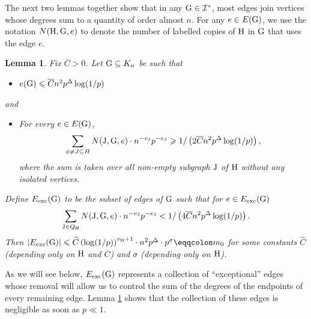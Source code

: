 \documentclass[a4paper,11pt,english,reqno]{amsart}
\numberwithin{equation}{section}
\renewcommand{\leq}{\leqslant}
\renewcommand{\geq}{\geqslant}
\newcommand{\cbar}{\overline{C}}
\newcommand{\I}{\mathcal{I}}
\newcommand{\uH}{\textup{H}}
\newcommand{\tu}[1]{\textup{#1}}
\newtheorem{lemma}[theorem]{Lemma}
\begin{document}
%	
%		
		The next two lemmas together show that in any $\tu{G}\in \I^{*}$, most edges join vertices whose degrees sum to a quantity of order almost $n$. For any $e\in E(\tu{G})$, we use the notation $N(\uH, \tu{G},e)$ to denote the number of labelled copies of $\uH$ in $\tu{G}$ that uses the edge $e$. 
		\begin{lemma}
			\label{s1:excluding edges}
			Fix $\cbar>0$. %
			Let $\tu{G}\subseteq K_{n}$ be such that 
			\begin{itemize}
				\item[(i).] $e(\tu{G})\leq \cbar n^{2}p^{\Delta}\log(1/p)$
			\end{itemize}
			and
			\begin{itemize}
				\item[(ii).] For every $e\in E(\tu{G})$,  
				\[
				\sum_{\phi\neq J\subseteq H}N(\tu{J}, \tu{G}, e)\cdot n^{-v_{\tu{J}}}p^{-e_{\tu{J}}}\geq 1/ \left(2 \cbar n^{2}p^{\Delta}\log(1/p)\right),
				\]
				where the sum is taken over all non-empty subgraph $\tu{J}$ of $\uH$ without any isolated vertices.
			\end{itemize}
			Define $E_{\text{exc}}(\tu{G})$ to be the subset of edges of $\tu{G}$ such that for $e\in E_{\text{exc}}(\tu{G})$
			\begin{equation*}
				\sum_{\tu{J}\in Q_{\uH}}N(\tu{J}, \tu{G}, e)\cdot n^{-v_{\tu{J}}}p^{-e_{\tu{J}}} < 1/\left(4\cbar n^{2}p^{\Delta}\log(1/p)\right).
			\end{equation*}
			Then $|E_{\text{exc}}(\tu{G})|\leq \widehat{C}\left(\log(1/p)\right)^{v_{\uH}+1} \cdot n^{2}p^{\Delta}\cdot p^{\sigma} \eqqcolon m_0$ for some constants $\widehat{C}$ (depending only on $\uH$ and $\cbar$) and $\sigma$ (depending only on $\uH$).
		\end{lemma}
		As we will see below, $E_{\text{exc}}(\tu{G})$ represents a collection of ``exceptional'' edges whose removal will allow us to control the sum of the degrees of the endpoints of every remaining edge. Lemma \ref{s1:excluding edges} shows that the collection of these edges is negligible as soon as $p \ll 1$.
		
\end{document}
